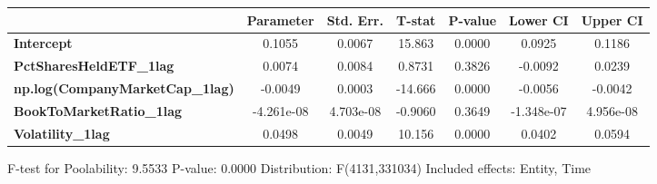 \begin{center}
\begin{tabular}{lclc}
\bottomrule
\end{tabular}
\begin{tabular}{lcccccc}
                                        & \textbf{Parameter} & \textbf{Std. Err.} & \textbf{T-stat} & \textbf{P-value} & \textbf{Lower CI} & \textbf{Upper CI}  \\
\midrule
\textbf{Intercept}                      &       0.1055       &       0.0067       &      15.863     &      0.0000      &       0.0925      &       0.1186       \\
\textbf{PctSharesHeldETF\_1lag}         &       0.0074       &       0.0084       &      0.8731     &      0.3826      &      -0.0092      &       0.0239       \\
\textbf{np.log(CompanyMarketCap\_1lag)} &      -0.0049       &       0.0003       &     -14.666     &      0.0000      &      -0.0056      &      -0.0042       \\
\textbf{BookToMarketRatio\_1lag}        &     -4.261e-08     &     4.703e-08      &     -0.9060     &      0.3649      &     -1.348e-07    &     4.956e-08      \\
\textbf{Volatility\_1lag}               &       0.0498       &       0.0049       &      10.156     &      0.0000      &       0.0402      &       0.0594       \\
\bottomrule
\end{tabular}
\end{center}

F-test for Poolability: 9.5533 \newline
 P-value: 0.0000 \newline
 Distribution: F(4131,331034) \newline
  \newline
 Included effects: Entity, Time